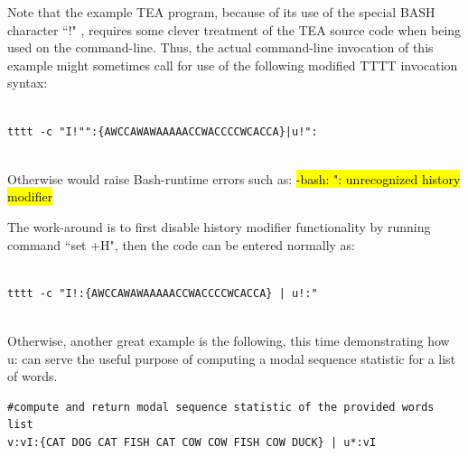 \documentclass[a4paper, 18pt]{book} %
\begin{document}
{{{Note that the example TEA program, because of its use of the special BASH character ``!" \cite{FSF2023Bash}, requires some clever treatment of the TEA source code when being used on the command-line. Thus, the actual command-line invocation of this example might sometimes call for use of the following modified TTTT invocation syntax:

\vspace{2em}

 \begin{tcolorbox}[myterminalstyle, title=TEA Applied to Tallying Votes (Alternative CLI Invocation Syntax)]
  \begin{lstlisting}
 
tttt -c "I!"":{AWCCAWAWAAAAACCWACCCCWCACCA}|u!":
             
  \end{lstlisting}
  \end{tcolorbox}

\vspace{2em}


Otherwise would raise Bash-runtime errors such as: \hl{-bash: ": unrecognized history modifier}

\vspace{2em}

The work-around is to first disable history modifier functionality by running command ``set +H", then the code can be entered normally as:


\vspace{2em}

 \begin{tcolorbox}[myterminalstyle, title=TEA Applied to Tallying Votes (Normal CLI Invocation Syntax)]
  \begin{lstlisting}
 
tttt -c "I!:{AWCCAWAWAAAAACCWACCCCWCACCA} | u!:"
             
  \end{lstlisting}
  \end{tcolorbox}

\vspace{2em}

Otherwise, another great example is the following, this time demonstrating how u: can serve the useful purpose of computing a modal sequence statistic for a list of words.


\vspace{1em}

  \begin{tcolorbox}[teaterminalstyle, title=U: EXAMPLE 2: Compute MSS for list of words, breakable]
  \begin{lstlisting}[language=TEA,breaklines=true,]
#compute and return modal sequence statistic of the provided words list
v:vI:{CAT DOG CAT FISH CAT COW COW FISH COW DUCK} | u*:vI
   \end{lstlisting}
  \end{tcolorbox}

}}}
\end{document}
